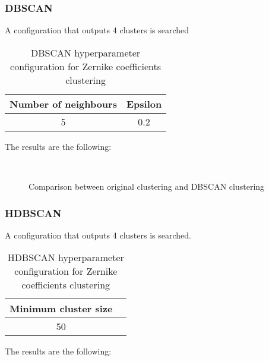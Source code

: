 		\subsubsection{DBSCAN}
			
			A configuration that outputs 4 clusters is searched
			
			\begin{table}[h!]
				\centering
				\begin{tabular}{|c|c|}
					\hline
					\textbf{Number of neighbours} & \textbf{Epsilon}\\
					\hline
					5 & 0.2\\
					\hline
				\end{tabular}
				\caption{DBSCAN hyperparameter configuration for Zernike coefficients clustering}
			\end{table}
		
			The results are the following:
			
			\begin{figure*}[ht!]
				\centering
				\hspace{\fill}
				\\
					
				\hspace{\fill}
				\caption{Comparison between original clustering and DBSCAN clustering}
			\end{figure*}
		\FloatBarrier
		
		\subsubsection{HDBSCAN}
			
			A configuration that outputs 4 clusters is searched.
			
			\begin{table}[h!]
				\centering
				\begin{tabular}{|c|c|}
					\hline
					\textbf{Minimum cluster size} \\
					\hline
					50 \\
					\hline
				\end{tabular}
				\caption{HDBSCAN hyperparameter configuration for Zernike coefficients clustering}
			\end{table}
			\FloatBarrier
			The results are the following:
			
